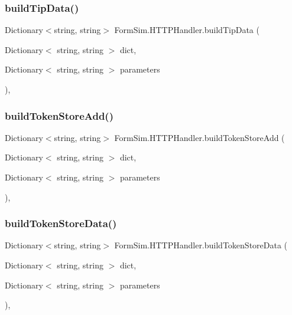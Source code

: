 \subsubsection{\texorpdfstring{build\+Tip\+Data()}{buildTipData()}}
{\footnotesize\ttfamily Dictionary$<$string, string$>$ Form\+Sim.\+H\+T\+T\+P\+Handler.\+build\+Tip\+Data (\begin{DoxyParamCaption}\item[{Dictionary$<$ string, string $>$}]{dict,  }\item[{Dictionary$<$ string, string $>$}]{parameters }\end{DoxyParamCaption})\hspace{0.3cm}{\ttfamily [inline]}, {\ttfamily [private]}}

\mbox{\label{class_form_sim_1_1_h_t_t_p_handler_ad44ba5b38c29b1ddd7fd87e35efa9157}} 
\subsubsection{\texorpdfstring{build\+Token\+Store\+Add()}{buildTokenStoreAdd()}}
{\footnotesize\ttfamily Dictionary$<$string, string$>$ Form\+Sim.\+H\+T\+T\+P\+Handler.\+build\+Token\+Store\+Add (\begin{DoxyParamCaption}\item[{Dictionary$<$ string, string $>$}]{dict,  }\item[{Dictionary$<$ string, string $>$}]{parameters }\end{DoxyParamCaption})\hspace{0.3cm}{\ttfamily [inline]}, {\ttfamily [private]}}

\mbox{\label{class_form_sim_1_1_h_t_t_p_handler_a817c861fd8d29ad2099c7e6abf4f0e7e}} 
\subsubsection{\texorpdfstring{build\+Token\+Store\+Data()}{buildTokenStoreData()}}
{\footnotesize\ttfamily Dictionary$<$string, string$>$ Form\+Sim.\+H\+T\+T\+P\+Handler.\+build\+Token\+Store\+Data (\begin{DoxyParamCaption}\item[{Dictionary$<$ string, string $>$}]{dict,  }\item[{Dictionary$<$ string, string $>$}]{parameters }\end{DoxyParamCaption})\hspace{0.3cm}{\ttfamily [inline]}, {\ttfamily [private]}}

